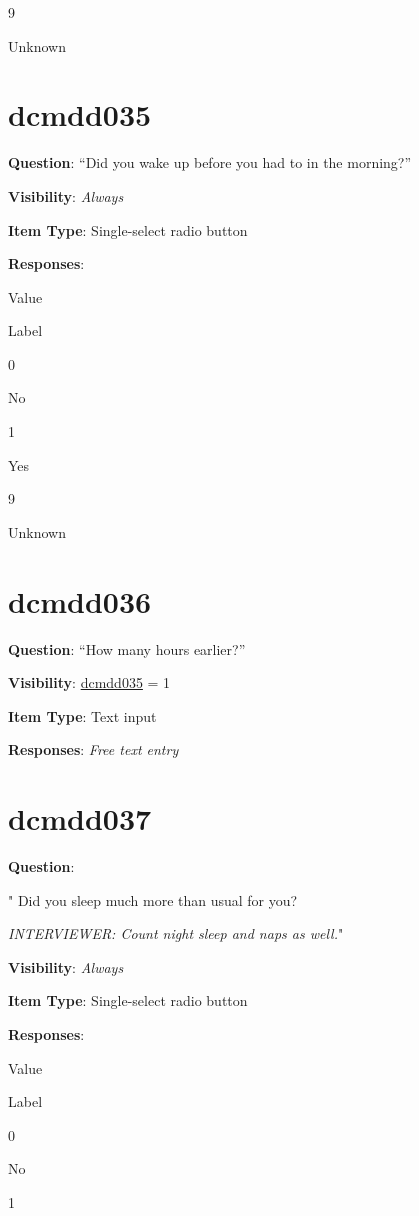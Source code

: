 \documentclass[
]{book}
\begin{document}
9

Unknown

\hypertarget{dcmdd035}{%
\section{dcmdd035}\label{dcmdd035}}

\textbf{Question}: ``Did you wake up before you had to in the morning?''

\textbf{Visibility}: \emph{Always}

\textbf{Item Type}: Single-select radio button

\textbf{Responses}:

Value

Label

0

No

1

Yes

9

Unknown

\hypertarget{dcmdd036}{%
\section{dcmdd036}\label{dcmdd036}}

\textbf{Question}: ``How many hours earlier?''

\textbf{Visibility}: \protect\hyperlink{dcmdd035}{dcmdd035} = 1

\textbf{Item Type}: Text input

\textbf{Responses}: \emph{Free text entry}

\hypertarget{dcmdd037}{%
\section{dcmdd037}\label{dcmdd037}}

\textbf{Question}:

"
Did you sleep much more than usual for you?

\emph{INTERVIEWER: Count night sleep and naps as well.}"

\textbf{Visibility}: \emph{Always}

\textbf{Item Type}: Single-select radio button

\textbf{Responses}:

Value

Label

0

No

1
\end{document}
